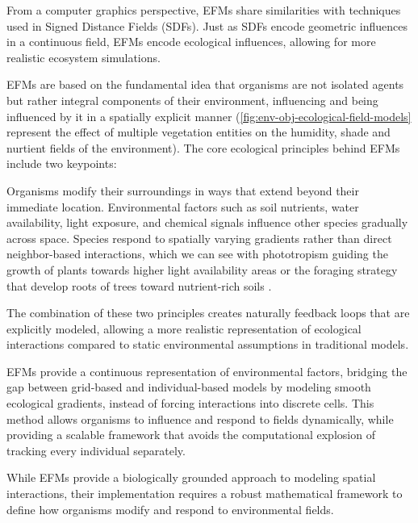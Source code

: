From a computer graphics perspective, EFMs share similarities with techniques used in Signed Distance Fields (SDFs). Just as SDFs encode geometric influences in a continuous field, EFMs encode ecological influences, allowing for more realistic ecosystem simulations.

EFMs are based on the fundamental idea that organisms are not isolated agents but rather integral components of their environment, influencing and being influenced by it in a spatially explicit manner (\cref{fig:env-obj-ecological-field-models} represent the effect of multiple vegetation entities on the humidity, shade and nurtient fields of the environment). The core ecological principles behind EFMs include two keypoints:
\begin{Itemize}
     Organisms modify their surroundings in ways that extend beyond their immediate location.    Environmental factors such as soil nutrients, water availability, light exposure, and chemical signals influence other species gradually across space.
     Species respond to spatially varying gradients rather than direct neighbor-based interactions, which we can see with phototropism guiding the growth of plants towards higher light availability areas \cite{Pirk2012} or the foraging strategy that develop roots of trees toward nutrient-rich soils \cite{Li2023}. 
\end{Itemize}

The combination of these two principles creates naturally feedback loops that are explicitly modeled, allowing a more realistic representation of ecological interactions compared to static environmental assumptions in traditional models.





EFMs provide a continuous representation of environmental factors, bridging the gap between grid-based and individual-based models by modeling smooth ecological gradients, instead of forcing interactions into discrete cells. This method allows organisms to influence and respond to fields dynamically, while providing a scalable framework that avoids the computational explosion of tracking every individual separately.


While EFMs provide a biologically grounded approach to modeling spatial interactions, their implementation requires a robust mathematical framework to define how organisms modify and respond to environmental fields. 





